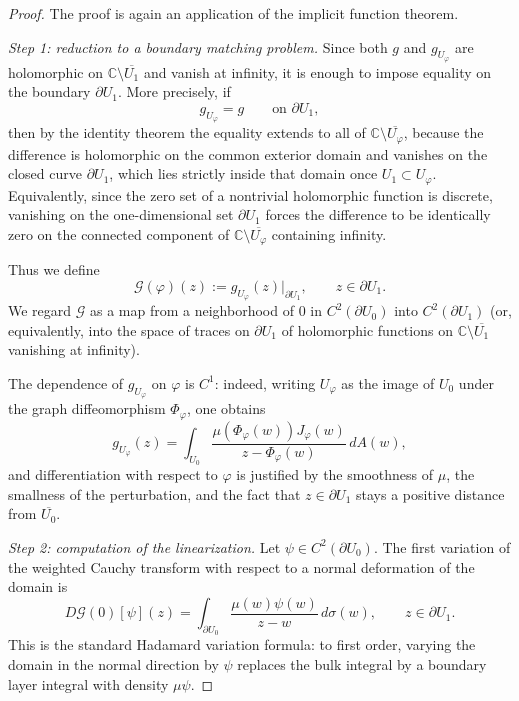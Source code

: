 \documentclass[a4paper,11pt,reqno]{amsart}
\numberwithin{equation}{section}
\theoremstyle{plain} %
\theoremstyle{definition} %
\theoremstyle{remark}
\newcommand{\C}{\mathbb{C}}
\begin{document}
\begin{proof}
The proof is again an application of the implicit function theorem.

\medskip
\noindent\emph{Step 1: reduction to a boundary matching problem.}
Since both \(g\) and \(g_{U_\varphi}\) are holomorphic on
\(\C\setminus \overline{U_1}\) and vanish at infinity, it is enough to impose
equality on the boundary \(\partial U_1\). More precisely, if
\[
g_{U_\varphi}=g
\qquad \text{on }\partial U_1,
\]
then by the identity theorem the equality extends to all of
\(\C\setminus \overline{U_\varphi}\), because the difference is holomorphic on the
common exterior domain and vanishes on the closed curve \(\partial U_1\), which
lies strictly inside that domain once \(U_1\subset U_\varphi\). Equivalently,
since the zero set of a nontrivial holomorphic function is discrete, vanishing
on the one-dimensional set \(\partial U_1\) forces the difference to be
identically zero on the connected component of \(\C\setminus \overline{U_\varphi}\)
containing infinity.

Thus we define
\[
\mathcal G(\varphi)(z)
:=
g_{U_\varphi}(z)\big|_{\partial U_1},
\qquad z\in \partial U_1.
\]
We regard \(\mathcal G\) as a map from a neighborhood of \(0\) in
\(C^2(\partial U_0)\) into \(C^2(\partial U_1)\) (or, equivalently, into the
space of traces on \(\partial U_1\) of holomorphic functions on
\(\C\setminus \overline{U_1}\) vanishing at infinity).

The dependence of \(g_{U_\varphi}\) on \(\varphi\) is \(C^1\): indeed, writing
\(U_\varphi\) as the image of \(U_0\) under the graph diffeomorphism
\(\Phi_\varphi\), one obtains
\[
g_{U_\varphi}(z)
=
\int_{U_0}
\frac{\mu(\Phi_\varphi(w))J_\varphi(w)}{z-\Phi_\varphi(w)}\,dA(w),
\]
and differentiation with respect to \(\varphi\) is justified by the smoothness of
\(\mu\), the smallness of the perturbation, and the fact that
\(z\in \partial U_1\) stays a positive distance from \(\overline{U_0}\).

\medskip
\noindent\emph{Step 2: computation of the linearization.}
Let \(\psi\in C^2(\partial U_0)\). The first variation of the weighted Cauchy
transform with respect to a normal deformation of the domain is
\begin{equation}\label{eq:appendix-shape-derivative-cauchy}
D\mathcal G(0)[\psi](z)
=
\int_{\partial U_0}
\frac{\mu(w)\psi(w)}{z-w}\,d\sigma(w),
\qquad z\in \partial U_1.
\end{equation}
This is the standard Hadamard variation formula: to first order, varying the
domain in the normal direction by \(\psi\) replaces the bulk integral by a
boundary layer integral with density \(\mu\psi\).


\end{proof}
\end{document}

